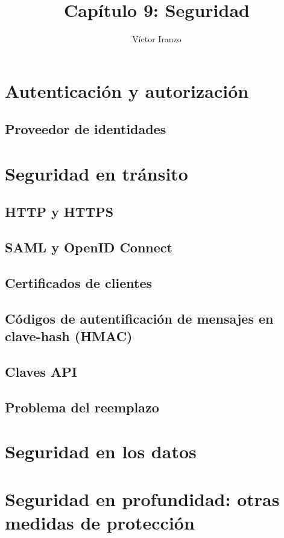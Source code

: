 \documentclass[11pt,a4paper]{article}
\author{Víctor Iranzo}
\title{Capítulo 9: Seguridad}
\begin{document}
\maketitle

\section{Autenticación y autorización}

\subsection{Proveedor de identidades}

\section{Seguridad en tránsito}

\subsection{HTTP y HTTPS}

\subsection{SAML y OpenID Connect}

\subsection{Certificados de clientes}

\subsection{Códigos de autentificación de mensajes en clave-hash (HMAC)}

\subsection{Claves API}

\subsection{Problema del reemplazo}

\section{Seguridad en los datos}

\section{Seguridad en profundidad: otras medidas de protección}
\end{document}
